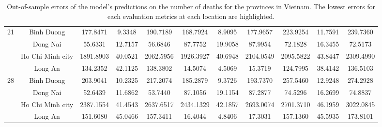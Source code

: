 \begin{landscape}
\begin{table}[!htb]
\begin{tabular}{| c | c | c | c | c | c | c | c | c | c | c |}
        \multirow{4}{*}{21}
            & Binh Duong & 177.8471 & 9.3348 & 190.7189 & 168.7924 & 8.9095 & 177.9657 & 223.9254 & 11.7591 & 239.7360
            \\ \cline{2-11}
            & Dong Nai & 55.6331 & 12.7157 & 56.6846 & 87.7752 & 19.9058 & 87.9954 & 72.1828 & 16.3455 & 72.5173
            \\ \cline{2-11}
            & Ho Chi Minh city & 1891.8903 & 40.0521 & 2062.5956 & 1926.3927 & 40.6948 & 2104.0549 & 2095.5822 & 43.8447 & 2309.4990
            \\ \cline{2-11}
            & Long An & 134.2352 & 42.1125 & 138.3802 & 14.5074 & 4.5069 & 15.3719 & 124.7995 & 38.4142 & 136.5103
            \\
        \hline

        \multirow{4}{*}{28}
            & Binh Duong & 203.9041 & 10.2325 & 217.2074 & 185.2879 & 9.3726 & 193.7370 & 257.5460 & 12.9248 & 274.2928
            \\ \cline{2-11}
            & Dong Nai & 52.6439 & 11.6862 & 53.7440 & 87.1056 & 19.1154 & 87.2877 & 74.5296 & 16.2699 & 74.8837
            \\ \cline{2-11}
            & Ho Chi Minh city & 2387.1554 & 41.4543 & 2637.6517 & 2434.1329 & 42.1857 & 2693.0074 & 2701.3710 & 46.1959 & 3022.0845
            \\ \cline{2-11}
            & Long An & 151.6080 & 45.0466 & 157.3411 & 16.4044 & 4.8406 & 17.3031 & 157.1360 & 45.5935 & 173.8101
            \\
        \hline
    \end{tabular}
    \caption{Out-of-sample errors of the model's predictions on the number of deaths for the provinces in Vietnam. The lowest errors for each evaluation metrics at each location are highlighted.}
\end{table}
\end{landscape}

